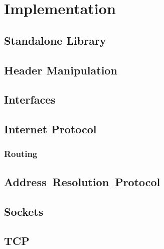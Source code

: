 

\chapter{Implementation}

    \section{Standalone Library}


    \section{Header Manipulation}

    \section{Interfaces}\label{sec:intf}

    \section{Internet Protocol}

        \subsection{Routing}

    \section{\mbox{Address Resolution Protocol}}

    \section{Sockets}

    \section{TCP}

